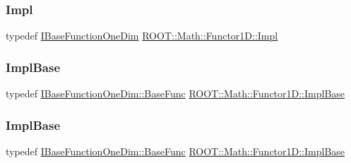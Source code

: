 \mbox{\label{classROOT_1_1Math_1_1Functor1D_ae7e0743edafd220a53b994cbbfbd7a9a}} 
\subsubsection{\texorpdfstring{Impl}{Impl}\hspace{0.1cm}{\footnotesize\ttfamily [2/2]}}
{\footnotesize\ttfamily typedef \mbox{\hyperlink{classROOT_1_1Math_1_1IBaseFunctionOneDim}{I\+Base\+Function\+One\+Dim}} \mbox{\hyperlink{classROOT_1_1Math_1_1Functor1D_ae7e0743edafd220a53b994cbbfbd7a9a}{R\+O\+O\+T\+::\+Math\+::\+Functor1\+D\+::\+Impl}}}

\mbox{\label{classROOT_1_1Math_1_1Functor1D_a1ade2017edb7db0cbaf9a27a864f4dd3}} 
\subsubsection{\texorpdfstring{ImplBase}{ImplBase}\hspace{0.1cm}{\footnotesize\ttfamily [1/2]}}
{\footnotesize\ttfamily typedef \mbox{\hyperlink{classROOT_1_1Math_1_1IBaseFunctionOneDim_a87fee465cea6b03c55aa6bc1cf641cc9}{I\+Base\+Function\+One\+Dim\+::\+Base\+Func}} \mbox{\hyperlink{classROOT_1_1Math_1_1Functor1D_a1ade2017edb7db0cbaf9a27a864f4dd3}{R\+O\+O\+T\+::\+Math\+::\+Functor1\+D\+::\+Impl\+Base}}}

\mbox{\label{classROOT_1_1Math_1_1Functor1D_a1ade2017edb7db0cbaf9a27a864f4dd3}} 
\subsubsection{\texorpdfstring{ImplBase}{ImplBase}\hspace{0.1cm}{\footnotesize\ttfamily [2/2]}}
{\footnotesize\ttfamily typedef \mbox{\hyperlink{classROOT_1_1Math_1_1IBaseFunctionOneDim_a87fee465cea6b03c55aa6bc1cf641cc9}{I\+Base\+Function\+One\+Dim\+::\+Base\+Func}} \mbox{\hyperlink{classROOT_1_1Math_1_1Functor1D_a1ade2017edb7db0cbaf9a27a864f4dd3}{R\+O\+O\+T\+::\+Math\+::\+Functor1\+D\+::\+Impl\+Base}}}



